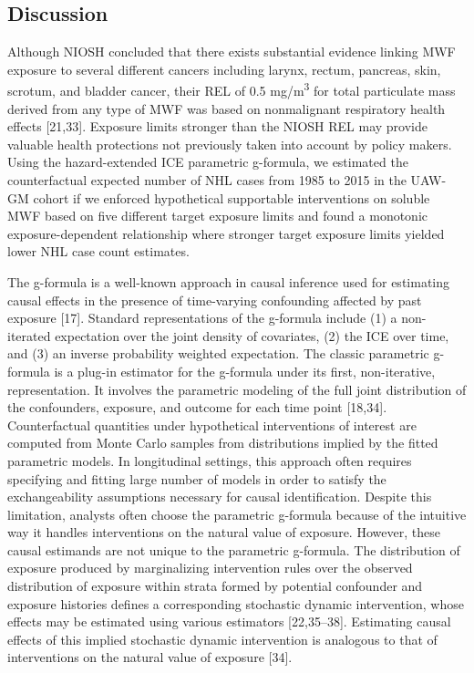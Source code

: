 \documentclass[
  11pt,
  letterpaper,
  DIV=11,
  numbers=noendperiod]{scrartcl}
\begin{document}
\subsection{Discussion}\label{discussion}

Although NIOSH concluded that there exists substantial evidence linking
MWF exposure to several different cancers including larynx, rectum,
pancreas, skin, scrotum, and bladder cancer, their REL of 0.5
mg/m\textsuperscript{3} for total particulate mass derived from any type
of MWF was based on nonmalignant respiratory health effects {[}21,33{]}.
Exposure limits stronger than the NIOSH REL may provide valuable health
protections not previously taken into account by policy makers. Using
the hazard-extended ICE parametric g-formula, we estimated the
counterfactual expected number of NHL cases from 1985 to 2015 in the
UAW-GM cohort if we enforced hypothetical supportable interventions on
soluble MWF based on five different target exposure limits and found a
monotonic exposure-dependent relationship where stronger target exposure
limits yielded lower NHL case count estimates.

The g-formula is a well-known approach in causal inference used for
estimating causal effects in the presence of time-varying confounding
affected by past exposure {[}17{]}. Standard representations of the
g-formula include (1) a non-iterated expectation over the joint density
of covariates, (2) the ICE over time, and (3) an inverse probability
weighted expectation. The classic parametric g-formula is a plug-in
estimator for the g-formula under its first, non-iterative,
representation. It involves the parametric modeling of the full joint
distribution of the confounders, exposure, and outcome for each time
point {[}18,34{]}. Counterfactual quantities under hypothetical
interventions of interest are computed from Monte Carlo samples from
distributions implied by the fitted parametric models. In longitudinal
settings, this approach often requires specifying and fitting large
number of models in order to satisfy the exchangeability assumptions
necessary for causal identification. Despite this limitation, analysts
often choose the parametric g-formula because of the intuitive way it
handles interventions on the natural value of exposure. However, these
causal estimands are not unique to the parametric g-formula. The
distribution of exposure produced by marginalizing intervention rules
over the observed distribution of exposure within strata formed by
potential confounder and exposure histories defines a corresponding
stochastic dynamic intervention, whose effects may be estimated using
various estimators {[}22,35--38{]}. Estimating causal effects of this
implied stochastic dynamic intervention is analogous to that of
interventions on the natural value of exposure {[}34{]}.
\end{document}
